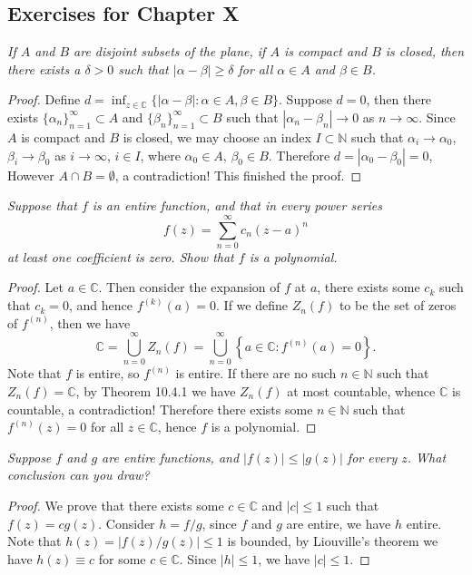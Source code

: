 \subsection{Exercises for Chapter X}
\begin{problem}\em
If $A$ and $B$ are disjoint subsets of the plane, if $A$ is compact and $B$ is closed, then there exists a $\delta>0$ such that $|\alpha-\beta|\ge\delta$ for all $\alpha\in A$ and $\beta\in B$.
\end{problem}
\begin{proof}
Define $d=\inf_{z\in\mathbb{C}}\{|\alpha-\beta|:\alpha\in A,\beta\in B\}$. Suppose $d=0$, then there exists $\{\alpha_n\}_{n=1}^\infty\subset A$ and $\{\beta_n\}_{n=1}^\infty\subset B$ such that $|\alpha_n-\beta_n|\to 0$ as $n\to\infty$. Since $A$ is compact and $B$ is closed, we may choose an index $I\subset\mathbb{N}$ such that $\alpha_i\to \alpha_0$, $\beta_i\to \beta_0$ as $i\to\infty$, $i\in I$, where $\alpha_0\in A$, $\beta_0\in B$. Therefore $d=|\alpha_0-\beta_0|=0$, However $A\cap B=\emptyset$, a contradiction! This finished the proof.
\end{proof}
\begin{problem}\em
Suppose that $f$ is an entire function, and that in every power series 
$$f(z)=\sum_{n=0}^\infty c_n(z-a)^n$$
at least one coefficient is zero. Show that $f$ is a polynomial.
\end{problem}
\begin{proof}
Let $a\in\mathbb{C}$. Then consider the expansion of $f$ at $a$, there exists some $c_k$ such that $c_k=0$, and hence $f^{(k)}(a)=0$. If we define $Z_n(f)$ to be the set of zeros of $f^{(n)}$, then we have 
$$
\mathbb{C} =\bigcup_{n=0}^{\infty}{Z_n\left( f \right)}=\bigcup_{n=0}^{\infty}{\left\{ a\in \mathbb{C} :f^{\left( n \right)}\left( a \right) =0 \right\}}.
$$
Note that $f$ is entire, so $f^{(n)}$ is entire. If there are no such $n\in\mathbb{N}$ such that $Z_n(f)=\mathbb{C}$, by Theorem 10.4.1 we have $Z_n(f)$ at most countable, whence $\mathbb{C}$ is countable, a contradiction! Therefore there exists some $n\in\mathbb{N}$ such that $f^{(n)}(z)=0$ for all $z\in\mathbb{C}$, hence $f$ is a polynomial.
\end{proof}
\begin{problem}\em
Suppose $f$ and $g$ are entire functions, and $|f(z)|\le |g(z)|$ for every $z$. What conclusion can you draw?
\end{problem}
\begin{proof}
We prove that there exists some $c\in\mathbb{C}$ and $|c|\le 1$ such that $f(z)=cg(z)$. Consider $h=f/g$, since $f$ and $g$ are entire, we have $h$ entire. Note that $h(z)=|f(z)/g(z)|\le 1$ is bounded, by Liouville's theorem we have $h(z)\equiv c$ for some $c\in\mathbb{C}$. Since $|h|\le 1$, we have $|c|\le 1$.
\end{proof}
